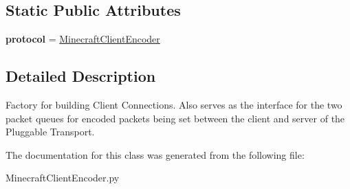 \subsection*{Static Public Attributes}
\begin{DoxyCompactItemize}
\item 
\hypertarget{classMinecraftClientEncoder_1_1MinecraftEncoderFactory_a6a94c5dbd65bda20f39399acdb9de9e9}{{\bfseries protocol} = \hyperlink{classMinecraftClientEncoder_1_1MinecraftClientEncoder}{Minecraft\-Client\-Encoder}}\label{classMinecraftClientEncoder_1_1MinecraftEncoderFactory_a6a94c5dbd65bda20f39399acdb9de9e9}

\end{DoxyCompactItemize}


\subsection{Detailed Description}
\begin{DoxyVerb}Factory for building Client Connections. Also serves as the interface
for the two packet queues for encoded packets being set between the
client and server of the Pluggable Transport.
\end{DoxyVerb}
 

The documentation for this class was generated from the following file\-:\begin{DoxyCompactItemize}
\item 
Minecraft\-Client\-Encoder.\-py\end{DoxyCompactItemize}
